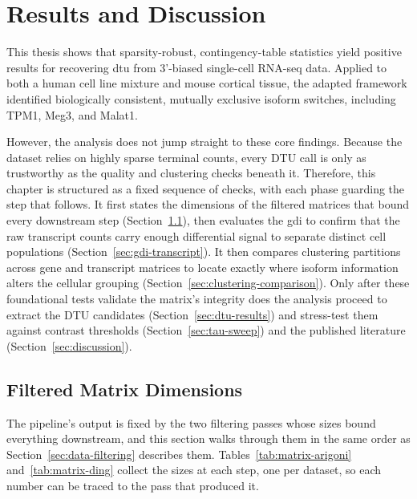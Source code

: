 \chapter{Results and Discussion}\label{chap:results}

This thesis shows that sparsity-robust, contingency-table statistics yield positive results for recovering \gls{dtu} from 3'-biased single-cell RNA-seq data. Applied to both a human cell line mixture and mouse cortical tissue, the adapted framework identified biologically consistent, mutually exclusive isoform switches, including TPM1, Meg3, and Malat1.

However, the analysis does not jump straight to these core findings. Because the dataset relies on highly sparse terminal counts, every DTU call is only as trustworthy as the quality and clustering checks beneath it. Therefore, this chapter is structured as a fixed sequence of checks, with each phase guarding the step that follows. It first states the dimensions of the filtered matrices that bound every downstream step (Section~\ref{sec:matrix-dimensions}), then evaluates the \gls{gdi} to confirm that the raw transcript counts carry enough differential signal to separate distinct cell populations (Section~\ref{sec:gdi-transcript}). It then compares clustering partitions across gene and transcript matrices to locate exactly where isoform information alters the cellular grouping (Section~\ref{sec:clustering-comparison}). Only after these foundational tests validate the matrix's integrity does the analysis proceed to extract the DTU candidates (Section~\ref{sec:dtu-results}) and stress-test them against contrast thresholds (Section~\ref{sec:tau-sweep}) and the published literature (Section~\ref{sec:discussion}).

\section{Filtered Matrix Dimensions}\label{sec:matrix-dimensions}

The pipeline's output is fixed by the two filtering passes whose sizes bound everything downstream, and this section walks through them in the same order as Section~\ref{sec:data-filtering} describes them. Tables~\ref{tab:matrix-arigoni} and~\ref{tab:matrix-ding} collect the sizes at each step, one per dataset, so each number can be traced to the pass that produced it.


